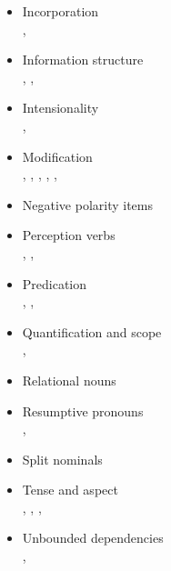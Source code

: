\documentclass[output=paper,hidelinks]{langscibook}
\begin{document}
\begin{paperappendix}
\begin{itemize}
\item Incorporation\\
  \citet{asudeh07}, \citet{Bakeretal2010}

\item Information structure\\
  \citet{DN}, \citet{Mycock2006}, \citet{morrison17}
  
\item Intensionality\\
  \citet{dalrymple;ea97b}, \citet{AshT:12}
        
\item Modification\\
  \citet{dalrympleetal93}, \citet{dalrymple-etal1999intro},
  \citet{dalrymple01}, \citet{asudeh:hpsg-glue},
  \citet{Andrews2018shs}, \citet[ch.\,13]{DLM:LFG}
  
\item 
  Negative polarity items\\ \citet{Fry:99}
  
\item Perception verbs\\
  \citet{AsudehToivonen2007,AshT:12},
  \citet{Asudeh12}, \citet{CES:LFG14}
  
\item 
  Predication\\
  \citet{dalrymple01}, \citet{asudeh:hpsg-glue}, \citet[ch.\,13]{DLM:LFG}
  
\item 
  Quantification and scope\\
  \citet{dalrymple;ea97b}, \citet[ch.\,8]{DLM:LFG}
  
\item Relational nouns\\
  \citet{Asudeh05reln}

\item Resumptive pronouns\\
  \citet{Asudeh2004,Asudeh05reln,Asudeh10,Asudeh12}, \citet{CamSad11:LFG}

\item Split nominals\\
  \citet{kuhn2001}

\item 
  Tense and aspect\\
  \citet{haug08}, \citet{bary;haug11}, \citet{Lowe2014,lowe15-sanskrit},
  \citet{belyaev20}

\item Unbounded dependencies\\
  \citet{Asudeh12}, \citet[ch.\,17]{DLM:LFG}

\end{itemize}
\end{paperappendix}
\sloppy
\printbibliography[heading=subbibliography,notkeyword=this]
\end{document}
